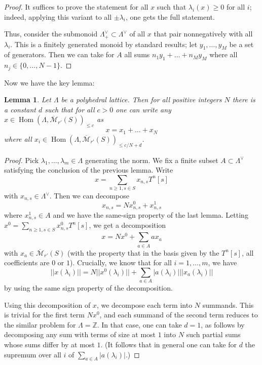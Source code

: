 \documentclass[11pt]{amsart}
\DeclareMathOperator{\Hom}{Hom}
\numberwithin{equation}{section}
\numberwithin{theorem}{section}
\newtheorem{lemma}[theorem]{Lemma}
\theoremstyle{definition}
\begin{document}
\begin{proof} It suffices to prove the statement for all $x$ such that $\lambda_i(x)\geq 0$ for all $i$; indeed, applying this variant to all $\pm \lambda_i$, one gets the full statement.

Thus, consider the submonoid $\Lambda^\vee_+\subset \Lambda^\vee$ of all $x$ that pair nonnegatively with all $\lambda_i$. This is a finitely generated monoid by standard results; let $y_1,\ldots,y_M$ be a set of generators. Then we can take for $A$ all sums $n_1y_1+\ldots+n_My_M$ where all $n_j\in \{0,\ldots,N-1\}$.
\end{proof}

Now we have the key lemma:

\begin{lemma}\label{lem:key} Let $\Lambda$ be a polyhedral lattice. Then for all positive integers $N$ there is a constant $d$ such that for all $c>0$ one can write any $x\in \Hom(\Lambda,\overline{\mathcal M}_{r'}(S))_{\leq c}$ as
\[
x=x_1+\ldots+x_N
\]
where all $x_i\in \Hom(\Lambda,\overline{\mathcal M}_{r'}(S))_{\leq c/N+d}$.
\end{lemma}

\begin{proof} Pick $\lambda_1,\ldots,\lambda_m\in \Lambda$ generating the norm. We fix a finite subset $A\subset \Lambda^\vee$ satisfying the conclusion of the previous lemma. Write
\[
x=\sum_{n\geq 1, s\in S} x_{n,s} T^n [s]
\]
with $x_{n,s}\in \Lambda^\vee$. Then we can decompose
\[
x_{n,s} = N x_{n,s}^0 + x_{n,s}^1
\]
where $x_{n,s}^1\in A$ and we have the same-sign property of the last lemma. Letting $x^0 = \sum_{n\geq 1, s\in S} x_{n,s}^0 T^n [s]$, we get a decomposition
\[
x = Nx^0 + \sum_{a\in A} a x_a
\]
with $x_a\in \overline{\mathcal M}_{r'}(S)$ (with the property that in the
basis given by the $T^n [s]$, all coefficients are $0$ or $1$). Crucially,
we know that for all $i=1,\ldots,m$, we have
\[
||x(\lambda_i)|| = N ||x^0(\lambda_i)|| + \sum_{a\in A} |a(\lambda_i)| ||x_a(\lambda_i)||
\]
by using the same sign property of the decomposition.

Using this decomposition of $x$, we decompose each term into $N$ summands. This is trivial for the first term $Nx^0$, and each summand of the second term reduces to the similar problem for $\Lambda=\mathbb Z$. In that case, one can take $d=1$, as follows by decomposing any sum with terms of size at most $1$ into $N$ such partial sums whose sums differ by at most $1$. (It follows that in general one can take for $d$ the supremum over all $i$ of $\sum_{a\in A} |a(\lambda_i)|$.)
\end{proof}
\end{document}
